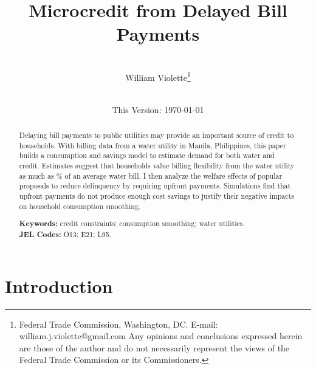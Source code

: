 \documentclass[12pt]{article}
\begin{document}
\begin{titlepage} 
\title{{Microcredit from Delayed Bill Payments}}
\author{\\[3em]
  William Violette\thanks{Federal Trade Commission, Washington, DC. E-mail: william.j.violette@gmail.com   Any opinions and conclusions expressed herein are those of the author and do not necessarily represent the views of the Federal Trade Commission or its Commissioners.} \\
 \\ 
  }
\vspace{30mm}
\date{\vspace{5mm}This Version: \today}
\maketitle
\begin{abstract}


Delaying bill payments to public utilities may provide an important source of credit to households.  With billing data from a water utility in Manila, Philippines, this paper builds a consumption and savings model to estimate demand for both water and credit.  Estimates suggest that households value billing flexibility  from the water utility as much as \unskip\% of an average water bill.  I then analyze the welfare effects of popular proposals to reduce delinquency by requiring upfront payments.  Simulations find that upfront payments do not produce enough cost savings  to justify their negative impacts on household consumption smoothing.


\vspace{2in}
\textbf{Keywords:} credit constraints; consumption smoothing; water utilities. \\
\textbf{JEL Codes:} O13; E21; L95. \\
\bigskip
\end{abstract}
\setcounter{page}{0}
\thispagestyle{empty}
\end{titlepage}
\pagebreak \newpage

\onehalfspacing

\section{Introduction}
\end{document}
